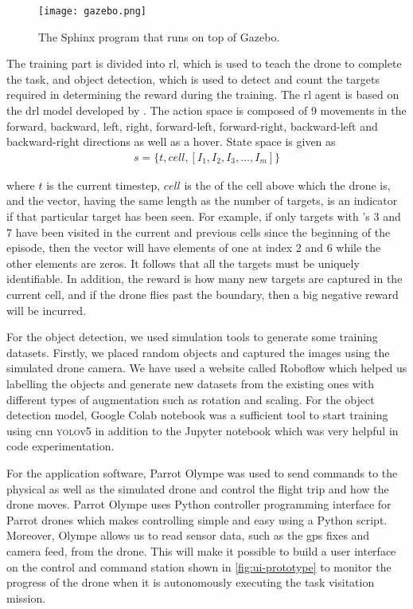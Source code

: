 \documentclass[../main.tex]{subfiles}
\begin{document}
\begin{figure}[tbp]
    \centering
    \texttt{[image: gazebo.png]}
    \caption{The Sphinx program that runs on top of Gazebo.}
    \label{fig:gazebo}
\end{figure}

The training part is divided into \gls{rl}, which is
used to teach the \anafi drone to complete the task, and object
detection, which is used to detect and count the targets
required in determining the reward during the training. 
The \gls{rl} agent is based on the \gls{drl} model 
developed by \textcite{Ged21}. The action space is composed 
of 9 movements in the 
forward, backward, left,
right, forward-left, forward-right, backward-left and 
backward-right directions as well as a hover.
State space is given as
\begin{align}
    s = \{ t, cell, [ I_1, I_2, I_3, \ldots, I_m] \} 
    \label{eq:state-space}
\end{align}

\noindent 
where $t$ is the current timestep, $cell$ is the \id of the
cell above which the drone is, and the vector, having the
same length as the number of targets, is an
indicator if that particular target has been seen. For example,
if only targets with \id's 3 and 7 have been visited
in the current and previous cells since the beginning of the 
episode,
then the vector will have elements of one at index 2 and 6 while
the other elements are zeros.
It follows that all the targets must be uniquely identifiable.
In addition, the reward is how many new targets are captured 
in the current cell,
and if the drone flies past the boundary, then a big negative
reward will be incurred.

For the object detection, we used simulation tools to 
generate some training datasets. Firstly, 
we placed random objects and captured the images 
using the simulated drone camera. We have used a 
website called Roboflow which helped us labelling 
the objects and generate new datasets from the 
existing ones with different types of augmentation 
such as rotation and scaling. 
For the object detection model, Google Colab notebook 
was a sufficient tool to start training using 
\gls{cnn} \textsc{yolo}v5 in addition to the 
Jupyter notebook which was very helpful 
in code experimentation. 

For the application software, Parrot Olympe 
was used to send commands to the physical as well as 
the simulated drone and control the flight trip and 
how the drone moves. Parrot Olympe uses Python 
controller programming interface for Parrot drones 
which makes controlling simple and easy using a 
Python script. Moreover, Olympe allows us to read
sensor data, such as the \gls{gps} fixes and camera feed, 
from the \anafi
drone. This will make it possible to build a user interface
on the control and command station
shown in \cref{fig:ui-prototype} to monitor 
the progress of the drone
when it is autonomously executing the task visitation
mission.
\end{document}
